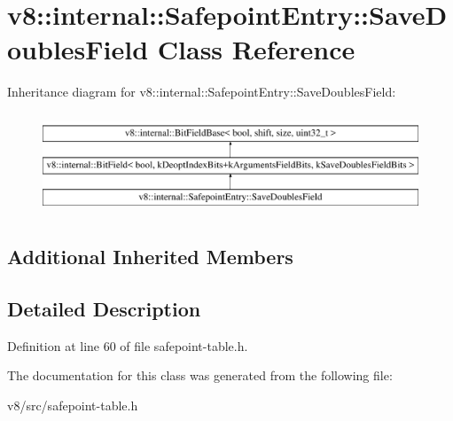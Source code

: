 \hypertarget{classv8_1_1internal_1_1SafepointEntry_1_1SaveDoublesField}{}\section{v8\+:\+:internal\+:\+:Safepoint\+Entry\+:\+:Save\+Doubles\+Field Class Reference}
\label{classv8_1_1internal_1_1SafepointEntry_1_1SaveDoublesField}
Inheritance diagram for v8\+:\+:internal\+:\+:Safepoint\+Entry\+:\+:Save\+Doubles\+Field\+:\begin{figure}[H]
\begin{center}
\leavevmode
\includegraphics[height=3.000000cm]{classv8_1_1internal_1_1SafepointEntry_1_1SaveDoublesField}
\end{center}
\end{figure}
\subsection*{Additional Inherited Members}


\subsection{Detailed Description}


Definition at line 60 of file safepoint-\/table.\+h.



The documentation for this class was generated from the following file\+:\begin{DoxyCompactItemize}
\item 
v8/src/safepoint-\/table.\+h\end{DoxyCompactItemize}
